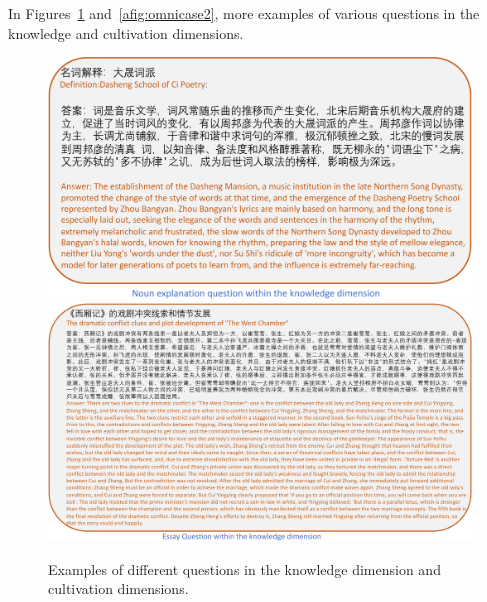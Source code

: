 
In Figures~\ref{afig:omnicase1} and~\ref{afig:omnicase2}, more examples of various questions in the knowledge and cultivation dimensions.

\begin{figure}[htbp]
    \centering
    \includegraphics[height=0.4\textwidth]{figure/omnicase1.pdf}
    \includegraphics[height=0.4\textwidth]{figure/omnicase2.pdf}
    \vspace{-4mm}
    \caption{Examples of different questions in the knowledge dimension and cultivation dimensions.}
    \label{afig:omnicase1}
\end{figure}



